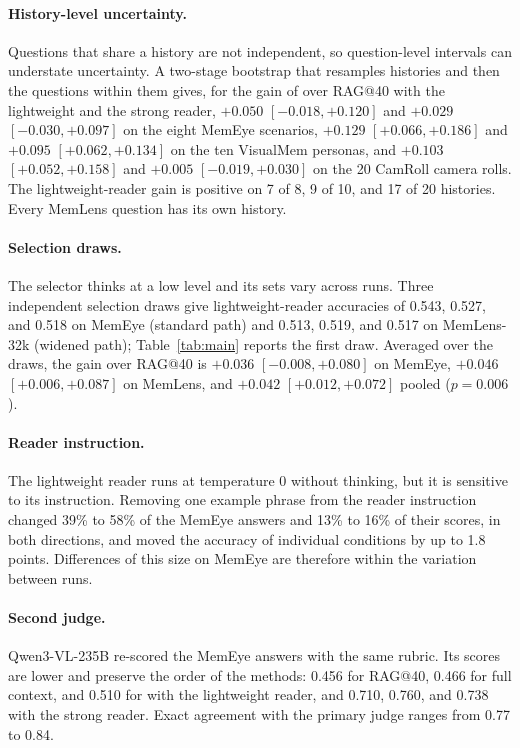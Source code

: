 \paragraph{History-level uncertainty.} Questions that share a history are not independent, so question-level intervals can understate uncertainty. A two-stage bootstrap that resamples histories and then the questions within them gives, for the gain of \vgs{} over RAG@40 with the lightweight and the strong reader, $+0.050$ $[-0.018, +0.120]$ and $+0.029$ $[-0.030, +0.097]$ on the eight MemEye scenarios, $+0.129$ $[+0.066, +0.186]$ and $+0.095$ $[+0.062, +0.134]$ on the ten VisualMem personas, and $+0.103$ $[+0.052, +0.158]$ and $+0.005$ $[-0.019, +0.030]$ on the 20 CamRoll camera rolls. The lightweight-reader gain is positive on 7 of 8, 9 of 10, and 17 of 20 histories. Every MemLens question has its own history.

\paragraph{Selection draws.} The selector thinks at a low level and its sets vary across runs. Three independent selection draws give lightweight-reader accuracies of 0.543, 0.527, and 0.518 on MemEye (standard path) and 0.513, 0.519, and 0.517 on MemLens-32k (widened path); Table~\ref{tab:main} reports the first draw. Averaged over the draws, the gain over RAG@40 is $+0.036$ $[-0.008, +0.080]$ on MemEye, $+0.046$ $[+0.006, +0.087]$ on MemLens, and $+0.042$ $[+0.012, +0.072]$ pooled ($p{=}0.006$).

\paragraph{Reader instruction.} The lightweight reader runs at temperature 0 without thinking, but it is sensitive to its instruction. Removing one example phrase from the reader instruction changed 39\% to 58\% of the MemEye answers and 13\% to 16\% of their scores, in both directions, and moved the accuracy of individual conditions by up to 1.8 points. Differences of this size on MemEye are therefore within the variation between runs.

\paragraph{Second judge.} Qwen3-VL-235B re-scored the MemEye answers with the same rubric. Its scores are lower and preserve the order of the methods: 0.456 for RAG@40, 0.466 for full context, and 0.510 for \vgs{} with the lightweight reader, and 0.710, 0.760, and 0.738 with the strong reader. Exact agreement with the primary judge ranges from 0.77 to 0.84.

